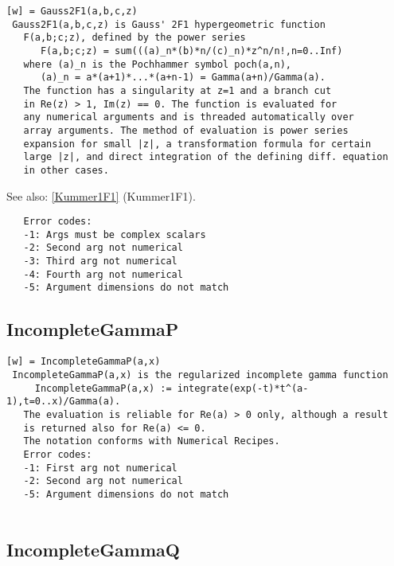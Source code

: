 \documentclass[a4paper]{article}
\begin{document}
\begin{tscreen}
\begin{verbatim}
[w] = Gauss2F1(a,b,c,z)
 Gauss2F1(a,b,c,z) is Gauss' 2F1 hypergeometric function
   F(a,b;c;z), defined by the power series
      F(a,b;c;z) = sum(((a)_n*(b)*n/(c)_n)*z^n/n!,n=0..Inf)
   where (a)_n is the Pochhammer symbol poch(a,n),
      (a)_n = a*(a+1)*...*(a+n-1) = Gamma(a+n)/Gamma(a).
   The function has a singularity at z=1 and a branch cut
   in Re(z) > 1, Im(z) == 0. The function is evaluated for
   any numerical arguments and is threaded automatically over
   array arguments. The method of evaluation is power series
   expansion for small |z|, a transformation formula for certain
   large |z|, and direct integration of the defining diff. equation
   in other cases.
\end{verbatim}

See also: \ref{Kummer1F1} {(Kummer1F1)}.
\begin{verbatim}
   Error codes:
   -1: Args must be complex scalars
   -2: Second arg not numerical
   -3: Third arg not numerical
   -4: Fourth arg not numerical
   -5: Argument dimensions do not match
\end{verbatim}
\end{tscreen}



\subsection{IncompleteGammaP\label{IncompleteGammaP}}

\begin{tscreen}
\begin{verbatim}
[w] = IncompleteGammaP(a,x)
 IncompleteGammaP(a,x) is the regularized incomplete gamma function
     IncompleteGammaP(a,x) := integrate(exp(-t)*t^(a-1),t=0..x)/Gamma(a).
   The evaluation is reliable for Re(a) > 0 only, although a result
   is returned also for Re(a) <= 0.
   The notation conforms with Numerical Recipes.
   Error codes:
   -1: First arg not numerical
   -2: Second arg not numerical
   -5: Argument dimensions do not match
 
\end{verbatim}
\end{tscreen}



\subsection{IncompleteGammaQ\label{IncompleteGammaQ}}
\end{document}
